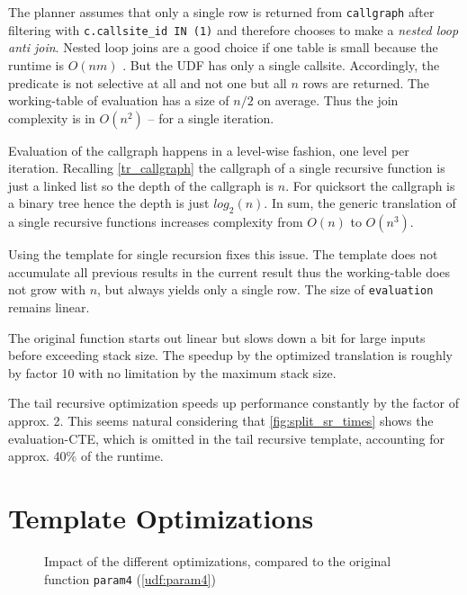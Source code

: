 The planner assumes that only a single row is returned from \texttt{callgraph} after filtering with \texttt{c.callsite\_id IN (1)} and therefore chooses to make a \textit{nested loop anti join}. Nested loop joins are a good choice if one table is small because the runtime is $O(nm)$ \cite[p. 454]{DMS}. But the UDF has only a single callsite. Accordingly, the predicate is not selective at all and not one but all $n$ rows are returned. The working-table of evaluation has a size of $n/2$ on average. Thus the join complexity is in $O(n^2)$ -- for a single iteration. 

Evaluation of the callgraph happens in a level-wise fashion, one level per iteration. Recalling \autoref{tr_callgraph} the callgraph of a single recursive function is just a linked list so the depth of the callgraph is $n$. For quicksort the callgraph is a binary tree hence the depth is just $log_2(n)$. In sum, the generic translation of a single recursive functions increases complexity from $O(n)$ to $O(n^3)$.

Using the template for single recursion fixes this issue. The template does not accumulate all previous results in the current result thus the working-table does not grow with $n$, but always yields only a single row. The size of \texttt{evaluation} remains linear.

The original function starts out linear but slows down a bit for large inputs before exceeding stack size. The speedup by the optimized translation is roughly by factor 10 with no limitation by the maximum stack size.

The tail recursive optimization speeds up performance constantly by the factor of approx. 2. This seems natural considering that \autoref{fig:split_sr_times} shows the evaluation-CTE, which is omitted in the tail recursive template, accounting for approx. 40\% of the runtime.

\section{Template Optimizations}


\begin{figure}[h!]
    \centering\scriptsize
    
    \caption{Impact of the different optimizations, compared to the original function \texttt{param4} (\autoref{udf:param4})}
    \label{fig:paramN}
\end{figure}



